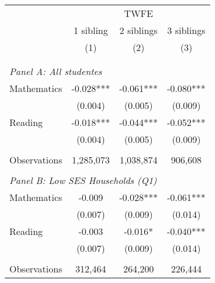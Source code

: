 \makeatletter
{}
{
\makeatother
\begin{tabular}{lccc}
\toprule
\cmidrule(lr){2-4}
& \multicolumn{3}{c}{TWFE} \\
\cmidrule(lr){2-4}
& 1 sibling & 2 siblings & 3 siblings  \\
\cmidrule(lr){2-2} \cmidrule(lr){3-3} \cmidrule(lr){4-4}
& (1) & (2) & (3)\\
\bottomrule
&  &  &  \\
&  &  &   \\
\multicolumn{4}{l}{\textit{Panel A: All studentes}} \\
\hspace{3mm}Mathematics&      -0.028***&      -0.061***&      -0.080***\\
                    &     (0.004)   &     (0.005)   &     (0.009)   \\
 
\hspace{3mm}Reading &      -0.018***&      -0.044***&      -0.052***\\
                    &     (0.004)   &     (0.005)   &     (0.009)   \\
                    &               &               &               \\
\hspace{3mm}Observations&   1,285,073   &   1,038,874   &     906,608   \\
 
&  &  &   \\
\multicolumn{4}{l}{\textit{Panel B: Low SES Households (Q1)}} \\
\hspace{3mm}Mathematics&      -0.009   &      -0.028***&      -0.061***\\
                    &     (0.007)   &     (0.009)   &     (0.014)   \\
 
\hspace{3mm}Reading &      -0.003   &      -0.016*  &      -0.040***\\
                    &     (0.007)   &     (0.009)   &     (0.014)   \\
                    &               &               &               \\
\hspace{3mm}Observations&     312,464   &     264,200   &     226,444   \\
 

\end{tabular}}
